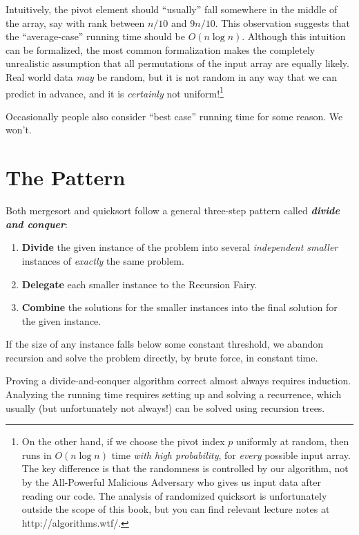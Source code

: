 Intuitively, the pivot element should “usually” fall somewhere in the middle of the array, say with rank between $n/10$ and $9n/10$. This observation suggests that the “average-case” running time should be $O(n \log n)$. Although this intuition can be formalized, the most common formalization makes the completely unrealistic assumption that all permutations of the input array are equally likely. Real world data \emph{may} be random, but it is not random in any way that we can predict in advance, and it is \emph{certainly} not uniform!\footnote{On the other hand, if we choose the pivot index $p$ uniformly at random, then  runs in $O(n \log n)$ time \emph{with high probability}, for \emph{every} possible input array. The key difference is that the randomness is controlled by our algorithm, not by the All-Powerful Malicious Adversary who gives us input data after reading our code. The analysis of randomized quicksort is unfortunately outside the scope of this book, but you can find relevant lecture notes at http://algorithms.wtf/.}

Occasionally people also consider “best case” running time for some reason. We won’t.

\section{The Pattern}
\label{sec:1.6}

Both mergesort and quicksort follow a general three-step pattern called \textbf{\textit{divide and conquer}}:

\begin{enumerate}
\item \textbf{Divide} the given instance of the problem into several \emph{independent smaller} instances of \emph{exactly} the same problem.

\item \textbf{Delegate} each smaller instance to the Recursion Fairy.

\item \textbf{Combine} the solutions for the smaller instances into the final solution for the given instance.
\end{enumerate}
If the size of any instance falls below some constant threshold, we abandon recursion and solve the problem directly, by brute force, in constant time.

Proving a divide-and-conquer algorithm correct almost always requires induction. Analyzing the running time requires setting up and solving a recurrence, which usually (but unfortunately not always!) can be solved using recursion trees.

